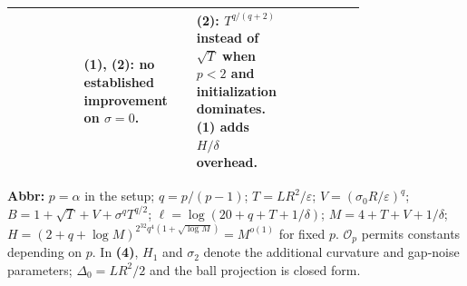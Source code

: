\begin{table}[tp]
\begin{threeparttable}
\begin{tabularx}{\linewidth}{@{}>{\raggedright\arraybackslash}p{0.20\linewidth}>{\raggedright\arraybackslash}p{0.32\linewidth}>{\raggedright\arraybackslash}p{0.25\linewidth}>{\raggedright\arraybackslash}X@{}}
& \textbf{(1)}, \textbf{(2)}: no established improvement on $\sigma=0$.
& \textbf{(2)}: $T^{q/(q+2)}$ instead of $\sqrt T$ when $p<2$ and initialization dominates. \textbf{(1)} adds $H/\delta$ overhead. \\
\bottomrule
\end{tabularx}
\begin{tablenotes}[flushleft]\footnotesize
\item[] \textbf{Abbr:} $p=\alpha$ in the setup; $q=p/(p-1)$; $T=LR^2/\varepsilon$; $V=(\sigma_0R/\varepsilon)^q$; $B=1+\sqrt T+V+\sigma^qT^{q/2}$; $\ell=\log(20+q+T+1/\delta)$; $M=4+T+V+1/\delta$; $H=(2+q+\log M)^{2^{32}q^4(1+\sqrt{\log M})}=M^{o(1)}$ for fixed $p$. $\mathcal{O}_p$ permits constants depending on $p$. In \textbf{(4)}, $H_1$ and $\sigma_2$ denote the additional curvature and gap-noise parameters; $\Delta_0=LR^2/2$ and the ball projection is closed form.
\end{tablenotes}
\end{threeparttable}
\end{table}
